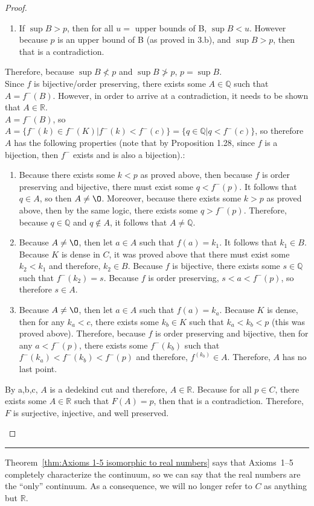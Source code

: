 \documentclass[openany, amssymb, psamsfonts]{amsart}
\newcommand{\bbQ}{\mathbb{Q}}
\newcommand{\bbR}{\mathbb{R}}
\renewcommand{\emptyset}{\O}
\theoremstyle{definition}
\numberwithin{equation}{section}
\begin{document}
\begin{proof}
\begin{enumerate}
\begin{enumerate}
    \item If $\sup B >p$, then for all $u=$ upper bounds of B, $\sup B <u$. However because $p$ is an upper bound of B (as proved in 3.b), and $\sup B >p$, then that is a contradiction. 
    \end{enumerate}
    Therefore, because $\sup B \not < p$ and $\sup B \not > p$, $p = \sup B$.\\
    Since $f$ is bijective/order preserving, there exists some $A\in \bbQ$ such that $A= f^-(B)$. However, in order to arrive at a contradiction, it needs to be shown that $A\in \bbR$. \\ $A = f^-(B)$, so $A = \{f^-(k)\in f^-(K) | f^-(k) <f^-(c) \} = \{q\in \bbQ | q <f^-(c) \}$, so therefore $A$ has the following properties (note that by Proposition 1.28, since $f$ is a bijection, then $f^-$ exists and is also a bijection).:
    \begin{enumerate}
    \item Because there exists some $k<p$ as proved above, then because $f$ is order preserving and bijective, there must exist some $q<f^-(p)$. It follows that $q\in A$, so then $A\neq \emptyset$. Moreover, because there exists some $k>p$ as proved above, then by the same logic, there exists some $q>f^-(p)$. Therefore, because $q\in \bbQ$ and $q\notin A$, it follows that $A \neq \bbQ$.
    \item Because $A\neq \emptyset$, then let $a\in A$ such that $f(a) = k_1$. It follows that $k_1\in B$. Because $K$ is dense in $C$, it was proved above that there must exist some $k_2<k_1$ and therefore, $k_2\in B$. Because $f$ is bijective, there exists some $s\in \bbQ$ such that $f^-(k_2) = s$. Because $f$ is order preserving, $s<a<f^-(p)$, so therefore $s \in A$. 
    \item Because $A\neq \emptyset$, then let $a\in A$ such that $f(a) = k_a$. Because $K$ is dense, then for any $k_a<c$, there exists some $k_b\in K$ such that $k_a<k_b<p$ (this was proved above). Therefore, because $f$ is order preserving and bijective, then for any $a<f^-(p)$, there exists some $f^-(k_b)$ such that $f^-(k_a)<f^-(k_b)<f^-(p)$ and therefore, $f^(k_b) \in A$. Therefore, $A$ has no last point.
    \end{enumerate}
    By a,b,c, $A$ is a dedekind cut and therefore, $A\in \bbR$. Because for all $p\in C$, there exists some $A\in \bbR$ such that $F(A) = p$, then that is a contradiction. Therefore, $F$ is surjective, injective, and well preserved.
\end{enumerate}
\end{proof}\vspace{4pt}     \hrule   \vspace{4pt}
Theorem~\ref{thm:Axioms 1-5 isomorphic to real numbers} says that Axioms~1--5 completely characterize the continuum, so we can say that the real numbers are the ``only'' continuum. As a consequence, we will no longer refer to $C$ as anything but $\bbR$. 
\end{document}
